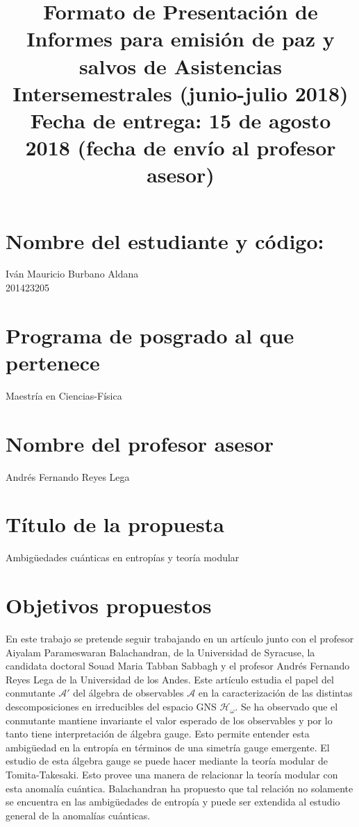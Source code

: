 \documentclass{article}
\title{Formato de Presentación de Informes para emisión de paz y salvos de Asistencias Intersemestrales (junio-julio 2018)
\\
Fecha de entrega: 15 de agosto 2018 (fecha de envío al profesor asesor)}
\begin{document}
\maketitle

\section{Nombre del estudiante y código:}

Iván Mauricio Burbano Aldana\\
201423205

\section{Programa de posgrado al que pertenece}

Maestría en Ciencias-Física

\section{Nombre del profesor asesor}

Andrés Fernando Reyes Lega

\section{Título de la propuesta}

Ambigüedades cuánticas en entropías y teoría modular

\section{Objetivos propuestos}

En este trabajo se pretende seguir trabajando en un artículo junto con el profesor Aiyalam Parameswaran Balachandran, de la Universidad de Syracuse, la candidata doctoral Souad Maria Tabban Sabbagh y el profesor Andrés Fernando Reyes Lega de la Universidad de los Andes. Este artículo estudia el papel del conmutante $\mathcal{A}'$ del álgebra de observables $\mathcal{A}$ en la caracterización de las distintas descomposiciones en irreducibles del espacio GNS $\mathcal{H}_\omega$. Se ha observado que el conmutante mantiene invariante el valor esperado de los observables y por lo tanto tiene interpretación de álgebra gauge. Esto permite entender esta ambigüedad en la entropía en términos de una simetría gauge emergente. El estudio de esta álgebra gauge se puede hacer mediante la teoría modular de Tomita-Takesaki. Esto provee una manera de relacionar la teoría modular con esta anomalía cuántica. Balachandran ha propuesto que tal relación no solamente se encuentra en las ambigüedades de entropía y puede ser extendida al estudio general de la anomalías cuánticas.
\end{document}
